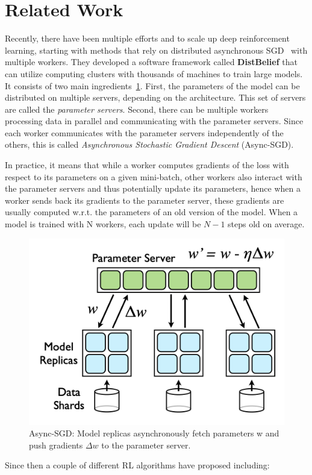 
\section{Related Work}\label{related_work}

Recently, there have been multiple efforts and to scale up deep reinforcement learning, starting with methods that rely on distributed asynchronous SGD~\parencite{dean2012large} with multiple workers. They developed a software framework
called \textbf{DistBelief} that can utilize computing clusters with thousands of machines to train large models. It consists of two main ingredients~\ref{fig:sgd}. First, the parameters of the model can be distributed on multiple servers, depending on the architecture. This set of servers are called the \textit{parameter
servers}. Second, there can be multiple workers processing data in parallel and communicating with the parameter servers. Since each worker communicates with the parameter servers independently of the others, this is
called \textit{Asynchronous Stochastic Gradient Descent} (Async-SGD).

In practice, it means that while a worker computes gradients of the loss with respect to its parameters on a given mini-batch, other workers also interact with the parameter servers and thus potentially update its parameters, hence when a worker sends back its gradients to the parameter server, these gradients are usually computed w.r.t. the parameters of an old version of the model. When a model is trained with N workers, each update will be $N-1$ steps old on average.

\begin{figure}[!htb]
		\centering
		\includegraphics[width=0.5\linewidth]{figures/algos/sgd.png}
		\caption{Async-SGD: Model replicas asynchronously fetch parameters w and push gradients \(\Delta w\) to the parameter server.}
		\label{fig:sgd}
\end{figure}


Since then a couple of different RL algorithms have proposed including:

